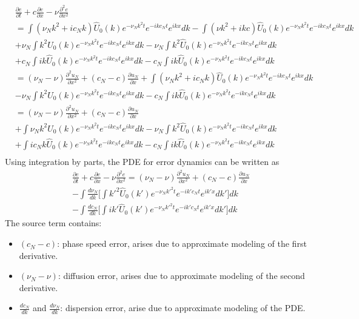 \documentclass[fleqn]{article}
\begin{document}
\begin{align*}
&\frac{\partial e}{\partial t} + c \frac{\partial e}{\partial x} - \nu \frac{\partial^2 e}{\partial x^2} \\
& = \int (\nu_N k^2 + i c_N k) \hat{U}_0(k) e^{-\nu_N k^2 t} e^{-i k c_N t} e^{i k x} dk - \int (\nu k^2+ikc) \hat{U}_0(k) e^{-\nu_N k^2 t} e^{-i k c_N t} e^{i k x} dk \\
& + \nu_N \int k^2 \hat{U}_0(k) e^{-\nu_N k^2 t} e^{-i k c_N t} e^{i k x} dk - \nu_N \int k^2 \hat{U}_0(k) e^{-\nu_N k^2 t} e^{-i k c_N t} e^{i k x} dk \\
& + c_N \int i k \hat{U}_0(k) e^{-\nu_N k^2 t} e^{-i k c_N t} e^{i k x} dk - c_N \int i k \hat{U}_0(k) e^{-\nu_N k^2 t} e^{-i k c_N t} e^{i k x} dk \\
& =  (\nu_N - \nu) \frac{\partial^2 u_N}{\partial x^2} + (c_N - c)  \frac{\partial u_N}{\partial x} + \int (\nu_N k^2 + i c_N k) \hat{U}_0(k) e^{-\nu_N k^2 t} e^{-i k c_N t} e^{i k x} dk \\
& - \nu_N \int k^2 \hat{U}_0(k) e^{-\nu_N k^2 t} e^{-i k c_N t} e^{i k x} dk - c_N \int i k \hat{U}_0(k) e^{-\nu_N k^2 t} e^{-i k c_N t} e^{i k x} dk \\
& =  (\nu_N - \nu) \frac{\partial^2 u_N}{\partial x^2} + (c_N - c)  \frac{\partial u_N}{\partial x} \\
& + \int \nu_N k^2 \hat{U}_0(k) e^{-\nu_N k^2 t} e^{-i k c_N t} e^{i k x} dk - \nu_N \int k^2 \hat{U}_0(k) e^{-\nu_N k^2 t} e^{-i k c_N t} e^{i k x} dk \\
& + \int  i c_N k \hat{U}_0(k) e^{-\nu_N k^2 t} e^{-i k c_N t} e^{i k x} dk - c_N \int i k \hat{U}_0(k) e^{-\nu_N k^2 t} e^{-i k c_N t} e^{i k x} dk \\
\end{align*}
Using integration by parts, the PDE for error dynamics can be written as
\begin{align*}
&\frac{\partial e}{\partial t} + c \frac{\partial e}{\partial x} - \nu \frac{\partial^2 e}{\partial x^2}  =  (\nu_N - \nu) \frac{\partial^2 u_N}{\partial x^2} + (c_N - c)  \frac{\partial u_N}{\partial x} \\
& - \int \frac{d \nu_N}{dk} \Big[ \int k'^2  \hat{U}_0(k') e^{-\nu_N k'^2 t} e^{-i k' c_N t} e^{i k' x} dk' \Big] dk \\
& - \int \frac{d c_N}{dk} \Big[ \int i k'  \hat{U}_0(k') e^{-\nu_N k'^2 t} e^{-i k' c_N t} e^{i k' x} dk' \Big] dk
\end{align*}
The source term contains:
\begin{itemize}
\item $(c_N - c)$: phase speed error, arises due to approximate modeling of the first derivative.
\item $(\nu_N - \nu)$: diffusion error, arises due to approximate modeling of the second derivative.
\item $\frac{d c_N}{dk}$ and $\frac{d \nu_N}{dk}$: dispersion error, arise due to approximate modeling of the PDE.  
\end{itemize}
\end{document}
